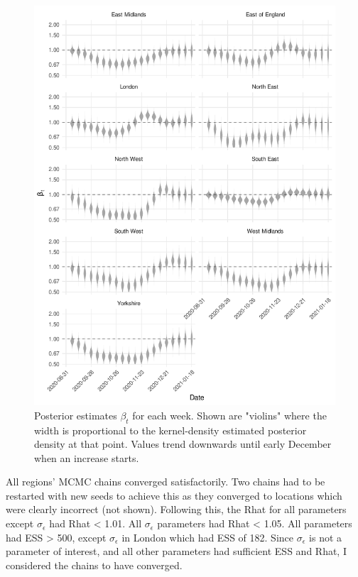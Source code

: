 \documentclass[thesis.tex]{subfiles}
\begin{document}
\begin{figure}
    \includegraphics{SEIR/CIS/beta_walk}
    \caption[Posterior estimates of $\beta_t$]{%
        Posterior estimates $\beta_t$ for each week.
        Shown are "violins" where the width is proportional to the kernel-density estimated posterior density at that point.
        Values trend downwards until early December when an increase starts.
    }
    \label{SEIR:fig:beta-walk}
\end{figure}

All regions' MCMC chains converged satisfactorily.
Two chains had to be restarted with new seeds to achieve this as they converged to locations which were clearly incorrect (not shown).
Following this, the Rhat for all parameters except $\sigma_\epsilon$ had Rhat < 1.01.
All $\sigma_\epsilon$ parameters had Rhat < 1.05.
All parameters had ESS > 500, except $\sigma_\epsilon$ in London which had ESS of 182.
Since $\sigma_\epsilon$ is not a parameter of interest, and all other parameters had sufficient ESS and Rhat, I considered the chains to have converged.
\end{document}

